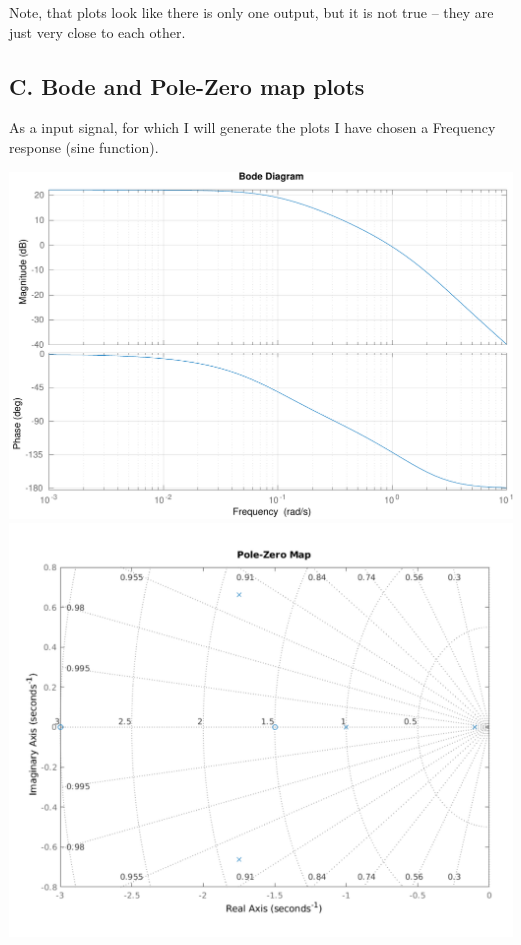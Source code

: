 \documentclass[a4paper,12pt]{article}
\begin{document}
    Note, that plots look like there is only one output, but it is not true -- 
    they are just very close to each other.

    \subsection*{C. Bode and Pole-Zero map plots}
    As a input signal, for which I will generate the plots I have chosen 
    a Frequency response (sine function).
    \begin{center}
        \includegraphics[width=\linewidth]{../Task1/ToReport/T1Bode.pdf}\\
        \includegraphics[width=\linewidth]{../Task1/ToReport/T1PoleZero.pdf}        
    \end{center}
\end{document}
